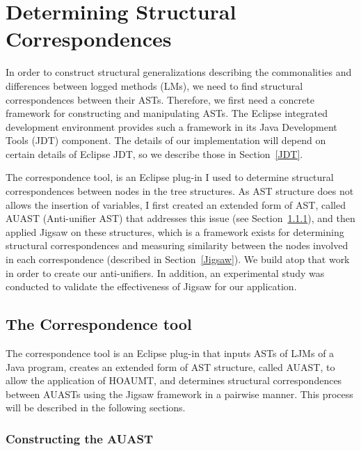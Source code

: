 \chapter{Determining Structural Correspondences}\label{background2}
In order to construct structural generalizations describing the commonalities and differences between logged methods (LMs), we need to find structural correspondences between their ASTs. Therefore, we first need a concrete framework for constructing and manipulating ASTs. The Eclipse integrated development environment provides such a framework in its Java Development Tools (JDT) component. The details of our implementation will depend on certain details of Eclipse JDT, so we describe those in Section~\ref{JDT}.

The correspondence tool, is an Eclipse plug-in I used to determine structural correspondences between nodes in the tree structures. As AST structure does not allows the insertion of variables, I first created an extended form of AST, called AUAST (Anti-unifier AST) that addresses this issue (see Section~\ref{AUAST}), and then applied Jigsaw \cite{2008:fse:cottrell} on these structures, which is a framework exists for determining structural correspondences and measuring similarity between the nodes involved in each correspondence (described in Section~\ref{Jigsaw}). We build atop that work in order to create our anti-unifiers. In addition, an experimental study was conducted to validate the effectiveness of Jigsaw for our application.


\section{The Correspondence tool} \label{correspondenceTool}
The correspondence tool is an Eclipse plug-in that inputs ASTs of LJMs of a Java program, creates an extended form of AST structure, called AUAST, to allow the application of HOAUMT, and determines structural correspondences between AUASTs using the Jigsaw framework in a pairwise manner. This process will be described in the following sections.

\subsection{Constructing the AUAST} \label{AUAST}

